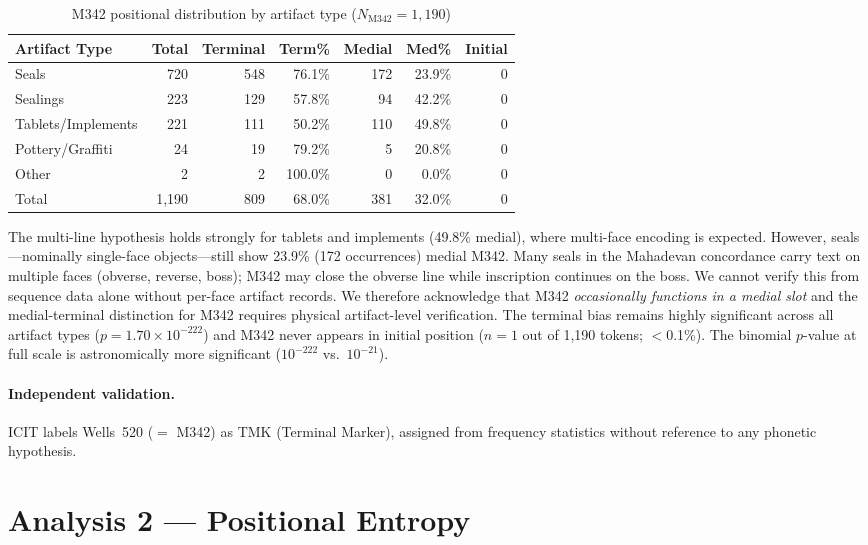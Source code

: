 \documentclass[12pt,letterpaper]{article}
\begin{document}
\begin{table}[htbp]
\centering
\caption{M342 positional distribution by artifact type ($N_{\text{M342}} = 1{,}190$)}
\label{tab:m342medial}
\begin{tabular}{lrrrrrr}
\toprule
Artifact Type & Total & Terminal & Term\% & Medial & Med\% & Initial \\
\midrule
Seals              & 720 & 548 & 76.1\% & 172 & 23.9\% & 0 \\
Sealings           & 223 & 129 & 57.8\% &  94 & 42.2\% & 0 \\
Tablets/Implements & 221 & 111 & 50.2\% & 110 & 49.8\% & 0 \\
Pottery/Graffiti   &  24 &  19 & 79.2\% &   5 & 20.8\% & 0 \\
Other              &   2 &   2 &100.0\% &   0 &  0.0\% & 0 \\
\midrule
Total              &1,190 & 809 & 68.0\% & 381 & 32.0\% & 0 \\
\bottomrule
\end{tabular}
\end{table}

The multi-line hypothesis holds strongly for tablets and implements
(49.8\% medial), where multi-face encoding is expected.
However, seals---nominally single-face objects---still show 23.9\%
(172 occurrences) medial M342.
Many seals in the Mahadevan concordance carry text on multiple faces
(obverse, reverse, boss); M342 may close the obverse line while
inscription continues on the boss.
We cannot verify this from sequence data alone without per-face artifact
records.
We therefore acknowledge that M342 \emph{occasionally functions in a
medial slot} and the medial-terminal distinction for M342 requires
physical artifact-level verification.
The terminal bias remains highly significant across all artifact types
($p = 1.70 \times 10^{-222}$) and M342 never appears in initial
position ($n = 1$ out of 1,190 tokens; $<$0.1\%).
The binomial $p$-value at full scale is astronomically more significant
($10^{-222}$ vs.\ $10^{-21}$).

\paragraph{Independent validation.}
ICIT \citep{Fuls2010} labels Wells~520 ($=$ M342) as TMK (Terminal
Marker), assigned from frequency statistics without reference to any
phonetic hypothesis.

\section{Analysis 2 --- Positional Entropy}
\label{sec:analysis2}
\end{document}
